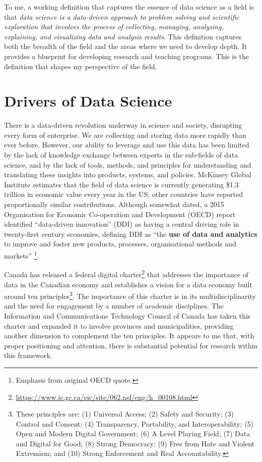 \documentclass[11pt]{article}
\begin{document}
To me, a working definition that captures the essence of data science as a field is that \textit{data science is a data-driven approach to problem solving and scientific exploration that involves the process of collecting, managing, analyzing, explaining, and visualizing data and analysis results}. This definition captures both the breadth of the field and the areas where we need to develop depth. It provides a blueprint for developing research and teaching programs. This is the definition that shapes my perspective of the field.



\section{Drivers of Data Science}

There is a data-driven revolution underway in science and society, disrupting every form of enterprise. We are collecting and storing data more rapidly than ever before. However, our ability to leverage and use this data has been limited by the lack of knowledge exchange between experts in the sub-fields of data science, and by the lack of tools, methods, and principles for understanding and translating these insights into products, systems, and policies. McKinsey Global Institute estimates that the field of data science is currently generating \$1.3 trillion in economic value every year in the US; other countries have reported proportionally similar contributions. Although somewhat dated, a 2015 Organisation for Economic Co-operation and Development (OECD) report identified ``data-driven innovation'' (DDI) as having a central driving role in twenty-first century economies, defining DDI as ``the \textbf{use of data and analytics} to improve and foster new products, processes, organisational methods and markets'' \footnote{Emphasis from original OECD quote.}.

Canada has released a federal digital charter\footnote{\url{https://www.ic.gc.ca/eic/site/062.nsf/eng/h_00108.html}} that addresses the importance of data in the Canadian economy and establishes a vision for a data economy built around ten principles\footnote{These principles are: (1) Universal Access; (2) Safety and Security; (3) Control and Consent; (4) Transparency, Portability, and Interoperability; (5) Open and Modern Digital Government; (6) A Level Playing Field; (7) Data and Digital for Good; (8) Strong Democracy; (9) Free from Hate and Violent Extremism; and (10) Strong Enforcement and Real Accountability.}. The importance of this charter is in its multidisciplinarity and the need for engagement by a number of academic disciplines. The Information and Communications Technology Council of Canada has taken this charter and expanded it to involve provinces and municipalities, providing another dimension to complement the ten principles. It appears to me that, with proper positioning and attention, there is substantial potential for research within this framework.
\end{document}
